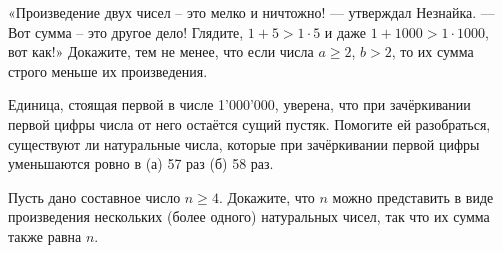 ﻿
\begin{itemize}

\itA «Произведение двух чисел – это мелко и ничтожно! — утверждал Незнайка.
— Вот сумма – это другое дело! Глядите, $1+5 > 1 \cdot 5$ и даже
$1+1000 > 1 \cdot 1000$, вот как!» Докажите, тем не менее, что если
числа $a \ge 2$, $b > 2$, то их сумма строго меньше их произведения.

\itB Единица, стоящая первой в числе 1'000'000, уверена, что при зачёркивании первой цифры числа от него остаётся сущий пустяк. Помогите ей разобраться, существуют ли натуральные числа, которые при зачёркивании первой цифры уменьшаются ровно в (а) 57 раз (б) 58 раз.

\itC Пусть дано составное число $n \geq 4$. Докажите, что $n$ можно представить в виде произведения нескольких (более одного) натуральных чисел, так что их сумма также равна $n$.
\end{itemize}